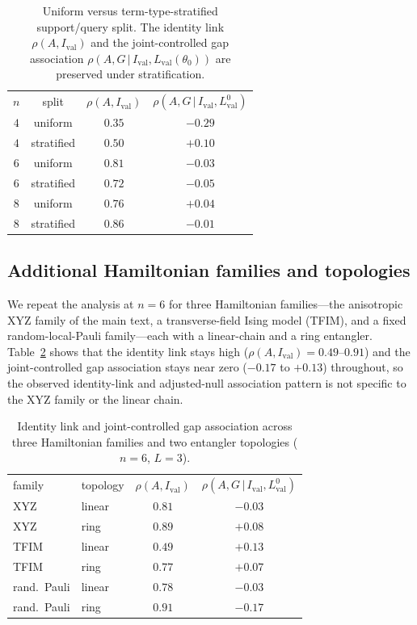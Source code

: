 \documentclass[aps,pra,onecolumn,superscriptaddress,10pt]{revtex4-2}
\newcommand{\Ival}{I_{\mathrm{val}}}
\newcommand{\thetaz}{\theta_0}
\newcommand{\Lval}{L_{\mathrm{val}}}
\begin{document}
\begin{table}[h]
\caption{\label{tab:strat}%
Uniform versus term-type-stratified support/query split. The identity link $\rho(A,\Ival)$ and the
joint-controlled gap association $\rho(A,G\,|\,\Ival,\Lval(\thetaz))$ are preserved under
stratification.}
\begin{ruledtabular}
\begin{tabular}{cccc}
$n$ & split & $\rho(A,\Ival)$ & $\rho(A,G\,|\,\Ival,\Lval^{0})$ \\
\colrule
$4$ & uniform    & $0.35$ & $-0.29$ \\
$4$ & stratified & $0.50$ & $+0.10$ \\
$6$ & uniform    & $0.81$ & $-0.03$ \\
$6$ & stratified & $0.72$ & $-0.05$ \\
$8$ & uniform    & $0.76$ & $+0.04$ \\
$8$ & stratified & $0.86$ & $-0.01$ \\
\end{tabular}
\end{ruledtabular}
\end{table}

\subsection{Additional Hamiltonian families and topologies}

We repeat the analysis at $n=6$ for three Hamiltonian families---the anisotropic XYZ family of the
main text, a transverse-field Ising model (TFIM), and a fixed random-local-Pauli family---each with a
linear-chain and a ring entangler. Table~\ref{tab:families} shows that the identity link stays high
($\rho(A,\Ival)=0.49$--$0.91$) and the joint-controlled gap association stays near zero ($-0.17$ to
$+0.13$) throughout, so the observed identity-link and adjusted-null association pattern is not specific to the XYZ family or the linear chain.

\begin{table}[h]
\caption{\label{tab:families}%
Identity link and joint-controlled gap association across three Hamiltonian families and two
entangler topologies ($n=6$, $L=3$).}
\begin{ruledtabular}
\begin{tabular}{llcc}
family & topology & $\rho(A,\Ival)$ & $\rho(A,G\,|\,\Ival,\Lval^{0})$ \\
\colrule
XYZ        & linear & $0.81$ & $-0.03$ \\
XYZ        & ring   & $0.89$ & $+0.08$ \\
TFIM       & linear & $0.49$ & $+0.13$ \\
TFIM       & ring   & $0.77$ & $+0.07$ \\
rand.\ Pauli & linear & $0.78$ & $-0.03$ \\
rand.\ Pauli & ring   & $0.91$ & $-0.17$ \\
\end{tabular}
\end{ruledtabular}
\end{table}
\end{document}
